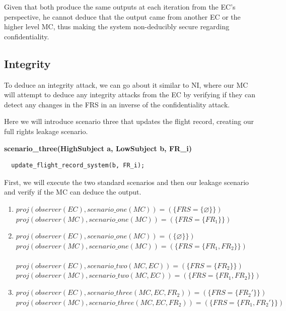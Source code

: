 \documentclass[10pt,journal,compsoc]{IEEEtran}
\begin{document}
Given that both produce the same outputs at each iteration from the EC's perspective, he cannot deduce that the output came from another EC or the higher level MC, thus making the system non-deducibly secure regarding confidentiality.

\subsection{Integrity}

To deduce an integrity attack, we can go about it similar to NI, where our MC will attempt to deduce any integrity attacks from the EC by verifying if they can detect any changes in the FRS in an inverse of the confidentiality attack.

Here we will introduce scenario three that updates the flight record, creating our full rights leakage scenario. 

\textbf{scenario\_three(HighSubject a, LowSubject b, FR\_i)}
\begin{lstlisting}
  update_flight_record_system(b, FR_i);
\end{lstlisting}  

First, we will execute the two standard scenarios and then our leakage scenario and verify if the MC can deduce the output. 

\begin{enumerate}
  \item $proj(observer (EC),scenario\_one(MC)) = (\{FRS = \{\varnothing\}\})$ \\
  $proj(observer (MC),scenario\_one(MC)) = (\{FRS = \{FR_1\}\})$ \\

  \item $proj(observer (EC),scenario\_one(MC)) = (\{\varnothing\}\})$ \\
  $proj(observer (MC),scenario\_one(MC)) = (\{FRS = \{FR_1, FR_2\}\})$ \\\\

  $proj(observer (EC),scenario\_two(MC, EC)) = (\{FRS = \{FR_2\}\})$ \\
  $proj(observer (MC),scenario\_two(MC, EC)) = (\{FRS = \{FR_1, FR_2\}\})$ \\

  \item $proj(observer (EC),scenario\_three(MC, EC, FR_2)) = (\{FRS = \{FR_2'\}\})$ \\
  $proj(observer (MC),scenario\_three(MC, EC, FR_2)) = (\{FRS = \{FR_1, FR_2'\}\})$ \\
\end{enumerate}
\end{document}
